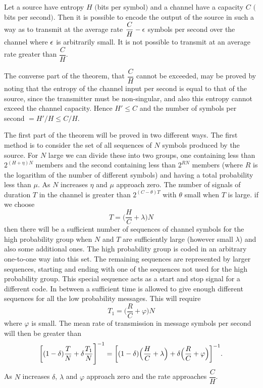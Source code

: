 \begin{theorem}
\label{thm:9}
Let a source have entropy $H$ $($bits per symbol$)$ and a channel have
a capacity $C$ $($bits per second$)$.  Then it is possible to encode the
output of the source in such a way as to transmit at the average rate
$\dfrac C H - \epsilon$ symbols per second over the channel where $\epsilon$
is arbitrarily small.  It is not possible to transmit at an average rate
greater than $\dfrac C H$.
\end{theorem}

The converse part of the theorem, that $\dfrac C H$ cannot be exceeded,
may be proved by noting that the entropy of the channel input per second is
equal to that of the source, since the transmitter must be non-singular,
and also this entropy cannot exceed the channel capacity.  Hence $H'
\le C$ and the number of symbols per second $= H'/H \le C/H$.

The first part of the theorem will be proved in two different ways.
The first method is to consider the set of all sequences of $N$ symbols
produced by the source.  For $N$ large we can divide these into two
groups, one containing less than $2^{(H+\eta)N}$ members and the second
containing less than $2^{RN}$ members (where $R$ is the logarithm of the
number of different symbols) and having a total probability less than
$\mu$.  As $N$ increases $\eta$ and $\mu$ approach zero.  The number of
signals of duration $T$ in the channel is greater than $2^{(C-\theta)T}$
with $\theta$ small when $T$ is large.  if we choose
$$
T = \biggl( \frac H C + \lambda \biggr) N
$$
then there will be a sufficient number of sequences of channel symbols
for the high probability group when $N$ and $T$ are sufficiently large
(however small $\lambda$) and also some additional ones.  The high
probability group is coded in an arbitrary one-to-one way into this set.
The remaining sequences are represented by larger sequences, starting and
ending with one of the sequences not used for the high probability group.
This special sequence acts as a start and stop signal for a different
code.  In between a sufficient time is allowed to give enough different
sequences for all the low probability messages.  This will require
$$
T_1 = \biggl(\frac R C + \varphi \biggr) N
$$
where $\varphi$ is small.  The mean rate of transmission in message
symbols per second will then be greater than
$$
\biggl[(1-\delta) \frac T N + \delta \frac{T_1}{N} \Biggr]^{-1} =
\biggl[(1-\delta) \Bigl(\frac H C + \lambda \Bigr) + \delta
  \Bigl(\frac R C + \varphi \Bigr) \biggr]^{-1}.
$$
As $N$ increases $\delta$, $\lambda$ and $\varphi$ approach zero and
the rate approaches $\dfrac C H$.

